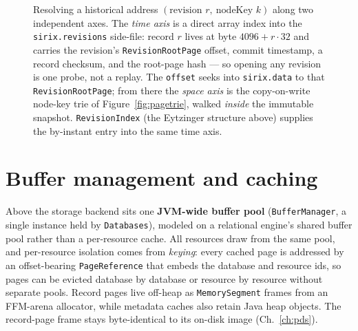 \documentclass[11pt,a4paper,oneside]{report}
\theoremstyle{sirixthm}
\newcommand{\code}[1]{\texttt{#1}}
\begin{document}
\begin{figure}[t]
\caption{Resolving a historical address $(\text{revision }r,\ \text{nodeKey }k)$ along two independent
axes. The \emph{time axis} is a direct array index into the \code{sirix.revisions} side-file: record $r$
lives at byte $4096+r\cdot 32$ and carries the revision's \code{RevisionRootPage} offset, commit timestamp,
a record checksum, and the root-page hash --- so opening any revision is one probe, not a replay. The
\code{offset} seeks into \code{sirix.data} to that \code{RevisionRootPage}; from there the \emph{space axis}
is the copy-on-write node-key trie of Figure~\ref{fig:pagetrie}, walked \emph{inside} the immutable
snapshot. \code{RevisionIndex} (the Eytzinger structure above) supplies the by-instant entry into the same
time axis.}
\label{fig:twoaxis}
\end{figure}

\section{Buffer management and caching}
\label{sec:buffering}

Above the storage backend sits one \textbf{JVM-wide buffer pool} (\code{BufferManager}, a single
instance held by \code{Databases}), modeled on a relational engine's shared buffer pool rather than a
per-resource cache. All resources draw from the same pool, and per-resource isolation comes from
\emph{keying}: every cached page is addressed by an offset-bearing \code{PageReference} that embeds the
database and resource ids, so pages can be evicted database by database or resource by resource without
separate pools. Record pages live off-heap as \code{MemorySegment} frames from an FFM-arena allocator,
while metadata caches also retain Java heap objects. The record-page frame stays byte-identical to its
on-disk image (Ch.~\ref{ch:pds}).
\end{document}
